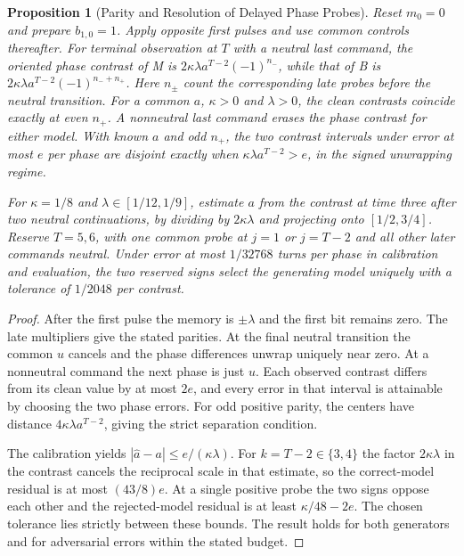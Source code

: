 \documentclass[11pt,a4paper]{article}
\newtheorem{proposition}{Proposition}[section]
\begin{document}
\begin{proposition}[Parity and Resolution of Delayed Phase Probes]\label{prop:delayed-phase-probe-parity}
Reset $m_0=0$ and prepare $b_{1,0}=1$. Apply opposite first pulses and use common controls thereafter. For terminal observation at $T$ with a neutral last command, the oriented phase contrast of M is $2\kappa\lambda a^{T-2}(-1)^{n_-}$, while that of B is $2\kappa\lambda a^{T-2}(-1)^{n_-+n_+}$. Here $n_\pm$ count the corresponding late probes before the neutral transition. For a common $a$, $\kappa>0$ and $\lambda>0$, the clean contrasts coincide exactly at even $n_+$. A nonneutral last command erases the phase contrast for either model. With known $a$ and odd $n_+$, the two contrast intervals under error at most $e$ per phase are disjoint exactly when $\kappa\lambda a^{T-2}>e$, in the signed unwrapping regime.

For $\kappa=1/8$ and $\lambda\in[1/12,1/9]$, estimate $a$ from the contrast at time three after two neutral continuations, by dividing by $2\kappa\lambda$ and projecting onto $[1/2,3/4]$. Reserve $T=5,6$, with one common probe at $j=1$ or $j=T-2$ and all other later commands neutral. Under error at most $1/32768$ turns per phase in calibration and evaluation, the two reserved signs select the generating model uniquely with a tolerance of $1/2048$ per contrast.
\end{proposition}
\begin{proof}
After the first pulse the memory is $\pm\lambda$ and the first bit remains zero. The late multipliers give the stated parities. At the final neutral transition the common $u$ cancels and the phase differences unwrap uniquely near zero. At a nonneutral command the next phase is just $u$. Each observed contrast differs from its clean value by at most $2e$, and every error in that interval is attainable by choosing the two phase errors. For odd positive parity, the centers have distance $4\kappa\lambda a^{T-2}$, giving the strict separation condition.

The calibration yields $|\hat a-a|\le e/(\kappa\lambda)$. For $k=T-2\in\{3,4\}$ the factor $2\kappa\lambda$ in the contrast cancels the reciprocal scale in that estimate, so the correct-model residual is at most $(43/8)e$. At a single positive probe the two signs oppose each other and the rejected-model residual is at least $\kappa/48-2e$. The chosen tolerance lies strictly between these bounds. The result holds for both generators and for adversarial errors within the stated budget.
\end{proof}
\end{document}
